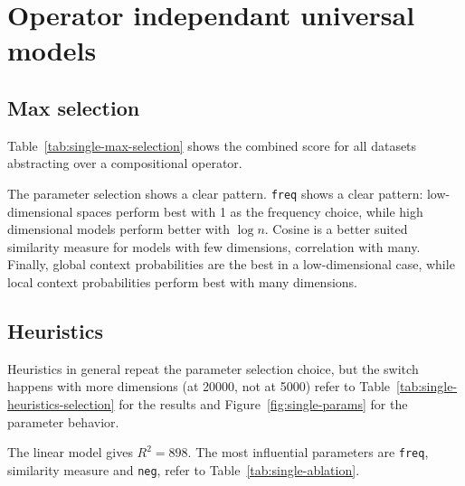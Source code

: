 
\section{Operator independant universal models}


\subsection{Max selection}
\label{sec:max-selection-single}

Table~\ref{tab:single-max-selection} shows  the combined score for all datasets abstracting over a compositional operator.

The parameter selection shows a clear pattern. \texttt{freq} shows a clear pattern: low-dimensional spaces perform best with 1 as the frequency choice, while high dimensional models perform better with $\log n$. Cosine is a better suited similarity measure for models with few dimensions, correlation with many. Finally, global context probabilities are the best in a low-dimensional case, while local context probabilities perform best with many dimensions.


\subsection{Heuristics}
\label{sec:heuristics-single}

Heuristics in general repeat the parameter selection choice, but the switch happens with more dimensions (at 20000, not at 5000) refer to Table~\ref{tab:single-heuristics-selection} for the results and Figure~\ref{fig:single-params} for the parameter behavior.


The linear model gives $R^2 = 898$. The most influential parameters are \texttt{freq}, similarity measure and \texttt{neg}, refer to Table~\ref{tab:single-ablation}.






